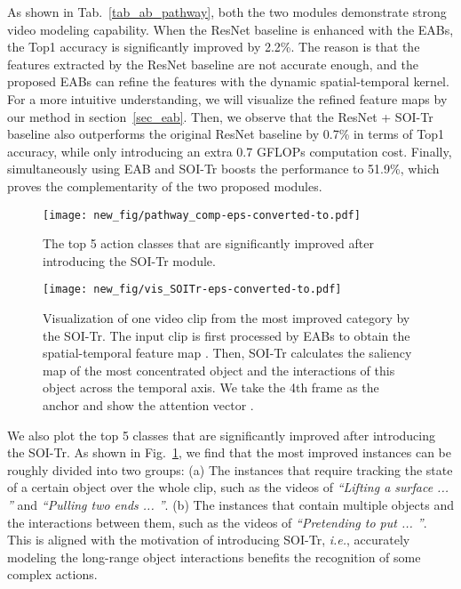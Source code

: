 As shown in Tab.~\ref{tab_ab_pathway}, both the two modules demonstrate strong video modeling capability.
When the ResNet baseline is enhanced with the EABs, the Top1 accuracy is significantly improved by 2.2\%. The reason is that the features extracted by the ResNet baseline are not accurate enough, and the proposed EABs can refine the features with the dynamic spatial-temporal kernel.
For a more intuitive understanding, we will visualize
the refined feature maps by our method in section~\ref{sec_eab}.
Then, we observe that the ResNet + SOI-Tr baseline also outperforms the original ResNet baseline by 0.7\% in terms of Top1 accuracy, while only introducing an extra 0.7 GFLOPs computation cost.
Finally, simultaneously using EAB and SOI-Tr boosts the performance to 51.9\%, which proves the complementarity of the two proposed modules.



\begin{figure}[!htb]
	\centering
	\begin{minipage}[t]{0.76\linewidth}
		\centering
		\centerline{\texttt{[image: new\_fig/pathway\_comp-eps-converted-to.pdf]}}
	\end{minipage}
	\caption {
		The top 5 action classes that are significantly improved after introducing the SOI-Tr module.
	}
	\label{fig_ab_pathway_comp}
\end{figure}



\begin{figure}[!thp]
	\centering
	\begin{minipage}[t]{0.74\linewidth}
		\centering
		\centerline{\texttt{[image: new\_fig/vis\_SOITr-eps-converted-to.pdf]}}
	\end{minipage}
	\caption {
		Visualization of one video clip from the most improved category by the SOI-Tr.
		The input clip is first processed by EABs to obtain the spatial-temporal feature map {}.
		Then, SOI-Tr calculates the saliency map {} of the most concentrated object and the interactions of this object across the temporal axis. We take the 4th frame as the anchor and show the attention vector {}.
	}
	\spaceabovetab
	\label{fig_vis_ean_soitr}
\end{figure}
We also plot the top 5 classes that are significantly improved after introducing the SOI-Tr. As shown in Fig.~\ref{fig_ab_pathway_comp},
we find that the most improved instances can be roughly divided into two groups:
{(a)} The instances that require tracking the state of a certain object over the whole clip, such as the videos of \textit{``Lifting a surface ... ''} and \textit{``Pulling two ends ... ''}.
{(b)} The instances that contain multiple objects and the interactions between them, such as the videos of \textit{``Pretending to put ... ''}.
This is aligned with the motivation of introducing SOI-Tr, \textit{i.e.}, accurately modeling the long-range object interactions benefits the recognition of some complex actions.





